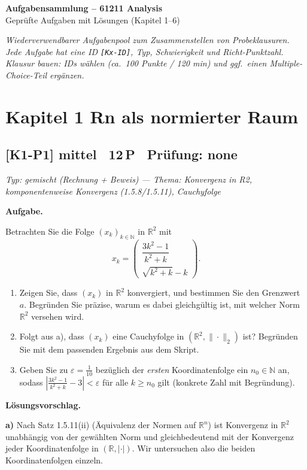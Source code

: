 \documentclass[a4paper,11pt]{article}
\begin{document}
\begin{center}{\LARGE\bfseries Aufgabensammlung -- 61211 Analysis}\\[0.3em]{\large Gepr\"ufte Aufgaben mit L\"osungen (Kapitel 1--6)}\end{center}
\medskip\textit{Wiederverwendbarer Aufgabenpool zum Zusammenstellen von Probeklausuren. Jede Aufgabe hat eine ID \texttt{[Kx-ID]}, Typ, Schwierigkeit und Richt-Punktzahl. Klausur bauen: IDs w\"ahlen (ca.\ 100 Punkte / 120 min) und ggf.\ einen Multiple-Choice-Teil erg\"anzen.}\par\medskip
\tableofcontents\newpage
\section*{Kapitel 1 \quad Rn als normierter Raum}
\subsection*{[K1-P1] \normalfont mittel \textbullet\ 12\,P \textbullet\ Pr\"ufung: none}
\textit{Typ: gemischt (Rechnung + Beweis)  ---  Thema: Konvergenz in R2, komponentenweise Konvergenz (1.5.8/1.5.11), Cauchyfolge}\par\smallskip
\textbf{Aufgabe.}\par
Betrachten Sie die Folge $(x_k)_{k\in\mathbb{N}}$ in $\mathbb{R}^2$ mit
\[ x_k = \begin{pmatrix} \dfrac{3k^2-1}{k^2+k} \\[2mm] \sqrt{k^2+k}-k \end{pmatrix}. \]
\begin{enumerate}[label=\alph*)]
\item Zeigen Sie, dass $(x_k)$ in $\mathbb{R}^2$ konvergiert, und bestimmen Sie den Grenzwert $a$. Begründen Sie präzise, warum es dabei gleichgültig ist, mit welcher Norm $\mathbb{R}^2$ versehen wird.
\item Folgt aus a), dass $(x_k)$ eine Cauchyfolge in $(\mathbb{R}^2,\|\cdot\|_2)$ ist? Begründen Sie mit dem passenden Ergebnis aus dem Skript.
\item Geben Sie zu $\varepsilon=\tfrac{1}{10}$ bezüglich der \emph{ersten} Koordinatenfolge ein $n_0\in\mathbb{N}$ an, sodass $\left|\tfrac{3k^2-1}{k^2+k}-3\right|<\varepsilon$ für alle $k\ge n_0$ gilt (konkrete Zahl mit Begründung).
\end{enumerate}\par\smallskip
\textbf{L\"osungsvorschlag.}\par
\textbf{a)} Nach Satz 1.5.11(ii) (Äquivalenz der Normen auf $\mathbb{R}^n$) ist Konvergenz in $\mathbb{R}^2$ unabhängig von der gewählten Norm und gleichbedeutend mit der Konvergenz jeder Koordinatenfolge in $(\mathbb{R},|\cdot|)$. Wir untersuchen also die beiden Koordinatenfolgen einzeln.
\end{document}
